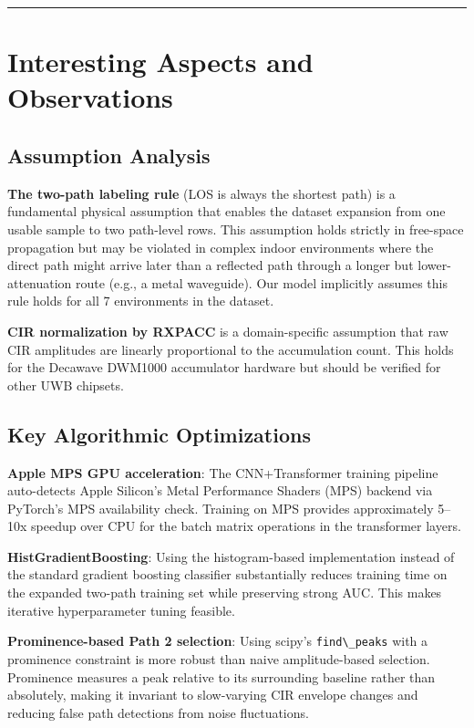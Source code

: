 \documentclass[12pt,a4paper]{article}
\newcommand{\passthrough}[1]{#1}
\providecommand{\passthrough}[1]{#1}
\begin{document}
\begin{center}\rule{0.5\linewidth}{0.5pt}\end{center}

\section{Interesting Aspects and
Observations}\label{interesting-aspects-and-observations}

\subsection{Assumption Analysis}\label{assumption-analysis}

\textbf{The two-path labeling rule} (LOS is always the shortest path) is
a fundamental physical assumption that enables the dataset expansion
from one usable sample to two path-level rows. This assumption holds
strictly in free-space propagation but may be violated in complex indoor
environments where the direct path might arrive later than a reflected
path through a longer but lower-attenuation route (e.g., a metal
waveguide). Our model implicitly assumes this rule holds for all 7
environments in the dataset.

\textbf{CIR normalization by RXPACC} is a domain-specific assumption
that raw CIR amplitudes are linearly proportional to the accumulation
count. This holds for the Decawave DWM1000 accumulator hardware but
should be verified for other UWB chipsets.

\subsection{Key Algorithmic
Optimizations}\label{key-algorithmic-optimizations}

\textbf{Apple MPS GPU acceleration}: The CNN+Transformer training
pipeline auto-detects Apple Silicon's Metal Performance Shaders (MPS)
backend via PyTorch's MPS availability check. Training on MPS provides
approximately 5--10x speedup over CPU for the batch matrix operations in
the transformer layers.

\textbf{HistGradientBoosting}: Using the histogram-based implementation
instead of the standard gradient boosting classifier substantially
reduces training time on the expanded two-path training set while
preserving strong AUC. This makes iterative hyperparameter tuning
feasible.

\textbf{Prominence-based Path 2 selection}: Using scipy's
\passthrough{\lstinline!find\_peaks!} with a prominence constraint is
more robust than naive amplitude-based selection. Prominence measures a
peak relative to its surrounding baseline rather than absolutely, making
it invariant to slow-varying CIR envelope changes and reducing false
path detections from noise fluctuations.
\end{document}
